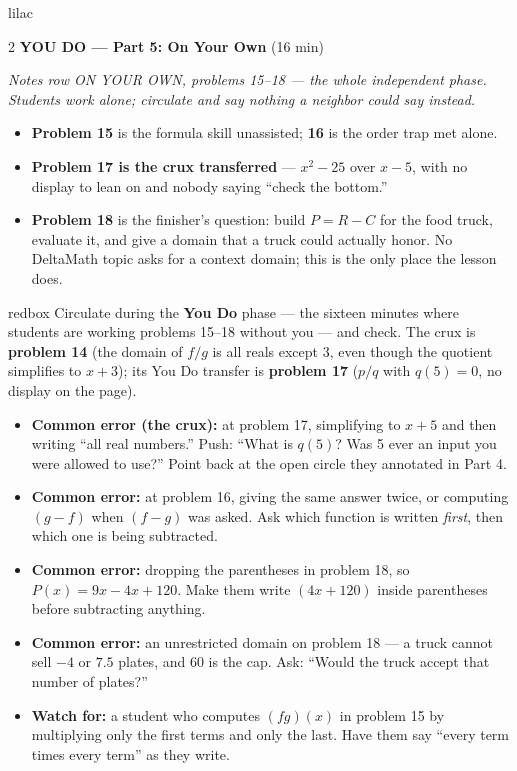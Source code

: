 \documentclass[10pt]{article}
\begin{document}
\begin{skillbox}{lilac}
\begin{multicols}{2}
\textbf{YOU DO --- Part 5: On Your Own} (16 min)

\textit{Notes row ON YOUR OWN, problems 15--18 --- the whole independent phase.
Students work alone; circulate and say nothing a neighbor could say instead.}
\begin{itemize}
  \item \textbf{Problem 15} is the formula skill unassisted; \textbf{16} is the
        order trap met alone.
  \item \textbf{Problem 17 is the crux transferred} --- $x^2 - 25$ over $x - 5$,
        with no display to lean on and nobody saying ``check the bottom.''
  \item \textbf{Problem 18} is the finisher's question: build $P = R - C$ for the
        food truck, evaluate it, and give a domain that a truck could actually
        honor. No DeltaMath topic asks for a context domain; this is
        the only place the lesson does.
\end{itemize}
\end{multicols}
\end{skillbox}

\begin{skillbox}{redbox}
Circulate during the \textbf{You Do} phase --- the sixteen minutes where students
are working problems 15--18 without you --- and check. The crux is
\textbf{problem 14} (the domain of $f/g$ is all reals except 3, even though the
quotient simplifies to $x+3$); its You Do transfer is \textbf{problem 17}
($p/q$ with $q(5) = 0$, no display on the page).
\begin{itemize}
  \item \textbf{Common error (the crux):} at problem 17, simplifying to $x + 5$
        and then writing ``all real numbers.'' Push: ``What is $q(5)$? Was 5 ever
        an input you were allowed to use?'' Point back at the open circle they
        annotated in Part 4.
  \item \textbf{Common error:} at problem 16, giving the same answer twice, or
        computing $(g-f)$ when $(f-g)$ was asked. Ask which function is written
        \emph{first}, then which one is being subtracted.
  \item \textbf{Common error:} dropping the parentheses in problem 18, so
        $P(x) = 9x - 4x + 120$. Make them write $(4x + 120)$ inside parentheses
        before subtracting anything.
  \item \textbf{Common error:} an unrestricted domain on problem 18 --- a truck
        cannot sell $-4$ or $7.5$ plates, and 60 is the cap. Ask: ``Would the
        truck accept that number of plates?''
  \item \textbf{Watch for:} a student who computes $(fg)(x)$ in problem 15 by
        multiplying only the first terms and only the last. Have them say
        ``every term times every term'' as they write.
\end{itemize}
\end{skillbox}
\end{document}
